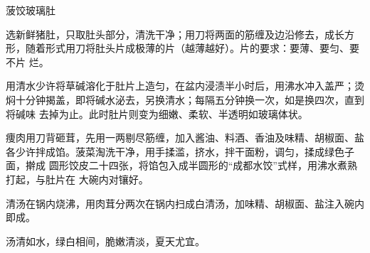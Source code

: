 \begin{recipe}{菠饺玻璃肚}

\ingredients


\preparation

\step 选新鲜猪肚，只取肚头部分，清洗干净；用刀将两面的筋缠及边沿修去，成长方
形，随着形式用刀将肚头片成极薄的片（越薄越好）。片的要求：要薄、要匀、要不片
烂。

\step 用清水少许将草碱溶化于肚片上造匀，在盆内浸渍半小时后，用沸水冲入盖严；烫
焖十分钟揭盖，即将碱水泌去，另换清水；每隔五分钟换一次，如是换四次，直到将碱味
去掉为止。此时肚片则变为细嫩、柔软、半透明如玻璃体状。

\step 痩肉用刀背砸茸，先用一两剔尽筋缠，加入酱油、料酒、香油及味精、胡椒面、盐
各少许拌成馅。菠菜淘洗干净，用手揉滥，挤水，拌干面粉，调匀，揉成绿色子面，擀成
圆形饺皮二十四张，将馅包入成半圆形的“成都水饺”式样，用沸水煮熟打起，与肚片在
大碗内对镶好。

\step 清汤在锅内烧沸，用肉茸分两次在锅内扫成白清汤，加味精、胡椒面、盐注入碗内
即成。

\features

汤清如水，绿白相间，脆嫩清淡，夏天尤宜。

\end{recipe}

